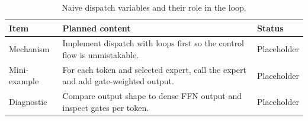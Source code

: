 \begin{table}[H]
\centering
\caption{Naive dispatch variables and their role in the loop.}
\label{tab:ch03-naive-token-by-token-dispatch}
\begin{tabularx}{\textwidth}{p{}X p{}}
\toprule
Item & Planned content & Status \\
\midrule
Mechanism & Implement dispatch with loops first so the control flow is unmistakable. & Placeholder \\
Mini-example & For each token and selected expert, call the expert and add gate-weighted output. & Placeholder \\
Diagnostic & Compare output shape to dense FFN output and inspect gates per token. & Placeholder \\
\bottomrule
\end{tabularx}
\end{table}
